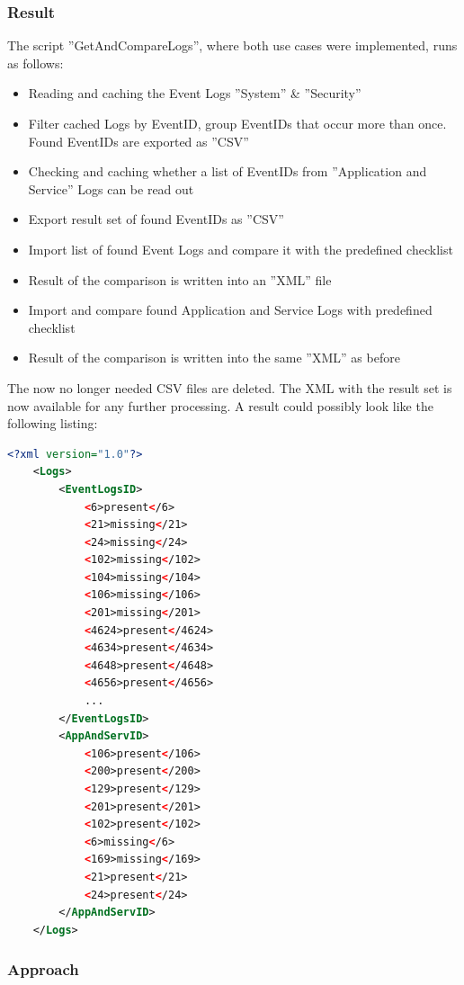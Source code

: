 \subsubsection{Result} \label{ResultSetGetAndCompareLogs}
The script ''GetAndCompareLogs'', where both use cases were implemented, runs as follows:
\begin{itemize}
    \item Reading and caching the Event Logs ''System'' \& ''Security''
    \item Filter cached Logs by EventID, group EventIDs that occur more than once. Found EventIDs are exported as ''CSV''
    \item Checking and caching whether a list of EventIDs from ''Application and Service'' Logs can be read out
    \item Export result set of found EventIDs as ''CSV''
    \item Import list of found Event Logs and compare it with the predefined checklist
    \item Result of the comparison is written into an ''XML'' file
    \item Import and compare found Application and Service Logs with predefined checklist
    \item Result of the comparison is written into the same ''XML'' as before
\end{itemize}
The now no longer needed CSV files are deleted. The XML with the result set is now available for any further processing.  A result could possibly look like the following listing:
\begin{lstlisting}[caption=Example Result Audit Policy Analysis, language=xml]
    <?xml version="1.0"?>
    <Logs>
        <EventLogsID>
            <6>present</6>
            <21>missing</21>
            <24>missing</24>
            <102>missing</102>
            <104>missing</104>
            <106>missing</106>
            <201>missing</201>
            <4624>present</4624>
            <4634>present</4634>
            <4648>present</4648>
            <4656>present</4656>
            ...
        </EventLogsID>
        <AppAndServID>
            <106>present</106>
            <200>present</200>
            <129>present</129>
            <201>present</201>
            <102>present</102>
            <6>missing</6>
            <169>missing</169>
            <21>present</21>
            <24>present</24>
        </AppAndServID>
    </Logs>
\end{lstlisting}


\subsubsection{Approach}
